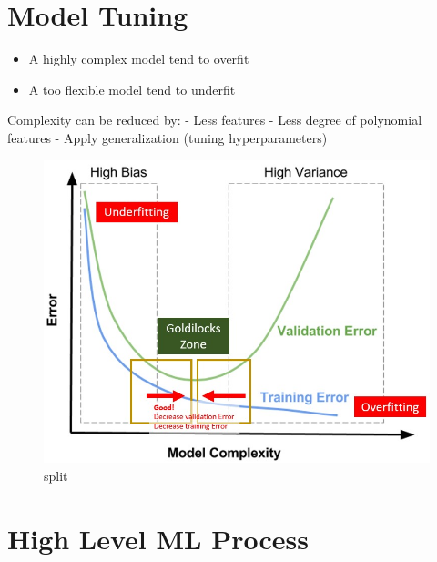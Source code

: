 \documentclass[
]{book}
\providecommand{\tightlist}{%
  \setlength{\itemsep}{0pt}\setlength{\parskip}{0pt}}
\begin{document}
\hypertarget{model-tuning}{%
\section{Model Tuning}\label{model-tuning}}

\begin{itemize}
\tightlist
\item
  A highly complex model tend to overfit
\item
  A too flexible model tend to underfit
\end{itemize}

Complexity can be reduced by: - Less features - Less degree of polynomial features - Apply generalization (tuning hyperparameters)

\begin{figure}
\centering
\includegraphics{img/model_complexity.jpg}
\caption{split}
\end{figure}

\hypertarget{high-level-ml-process}{%
\section{High Level ML Process}\label{high-level-ml-process}}
\end{document}
